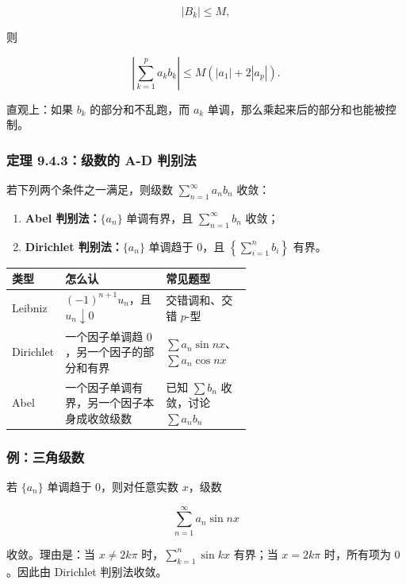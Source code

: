 \[
      |B_k|\le M,
    \]

则

\[
      \left|\sum_{k=1}^{p}a_kb_k\right|
      \le M\left(|a_1|+2|a_p|\right).
    \]

直观上：如果 \(b_k\) 的部分和不乱跑，而 \(a_k\) 单调，那么乘起来后的部分和也能被控制。

\subsubsection*{定理 9.4.3：级数的 A-D 判别法}

若下列两个条件之一满足，则级数 \(\sum_{n=1}^{\infty}a_nb_n\) 收敛：

\begin{enumerate}
 \item \textbf{Abel 判别法：}\(\{a_n\}\) 单调有界，且 \(\sum_{n=1}^{\infty}b_n\) 收敛；
 \item \textbf{Dirichlet 判别法：}\(\{a_n\}\) 单调趋于 \(0\)，且 \(\left\{\sum_{i=1}^{n}b_i\right\}\) 有界。
 \end{enumerate}

\begin{center}
\small
\begin{tabularx}{\linewidth}{|>{\raggedright\arraybackslash}p{0.18\linewidth}|>{\raggedright\arraybackslash}p{0.42\linewidth}|>{\raggedright\arraybackslash}X|}
\hline
\textbf{类型} & \textbf{怎么认} & \textbf{常见题型} \\ \hline
Leibniz & \((-1)^{n+1}u_n\)，且 \(u_n\downarrow0\) & 交错调和、交错 \(p\)-型 \\ \hline
Dirichlet & 一个因子单调趋 \(0\)，另一个因子的部分和有界 & \(\sum a_n\sin nx\)、\(\sum a_n\cos nx\) \\ \hline
Abel & 一个因子单调有界，另一个因子本身成收敛级数 & 已知 \(\sum b_n\) 收敛，讨论 \(\sum a_nb_n\) \\ \hline
\end{tabularx}
\end{center}

\subsubsection*{例：三角级数}

若 \(\{a_n\}\) 单调趋于 \(0\)，则对任意实数 \(x\)，级数

\[
      \sum_{n=1}^{\infty}a_n\sin nx
    \]

收敛。理由是：当 \(x\ne 2k\pi\) 时，\(\sum_{k=1}^{n}\sin kx\) 有界；当 \(x=2k\pi\) 时，所有项为 \(0\)。因此由 Dirichlet 判别法收敛。

